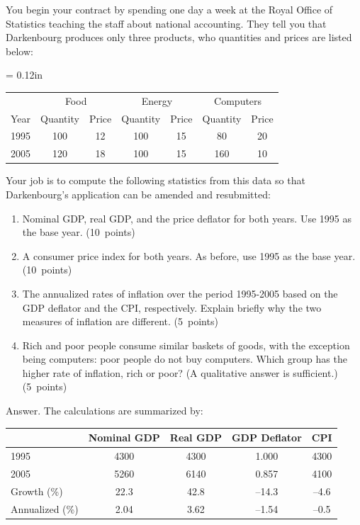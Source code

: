 \documentclass[letterpaper,12pt]{article}
\begin{document}
\begin{enumerate}
You begin your contract by spending one day a week at the Royal
Office of Statistics teaching the staff about national accounting.
They tell you that Darkenbourg produces only three products, 
who quantities and prices are listed below:  
\begin{center}
\tabcolsep = 0.12in
\begin{tabular}{lcccccc}
\hline\hline%
     &\multicolumn{2}{c}{Food}
     &\multicolumn{2}{c}{Energy} 
     &\multicolumn{2}{c}{Computers}\\%
\cline{2-7}%
Year &   Quantity & Price   & Quantity &    Price   &  Quantity & Price    \\
\hline\hline%
1995 &     100    & 12 & 100 & 15 & 80  & 20  \\%
2005 &     120    & 18 & 100 & 15 & 160 & 10 \\%
\hline\hline%
\end{tabular}
\end{center}
Your job is to compute the following statistics from this data so
that Darkenbourg's application can be amended and resubmitted:
%
\begin{enumerate}
\item Nominal GDP, real GDP, and the price deflator for both
years. 
Use 1995 as the base year.  
(10~points)

\item A consumer price index for both years. 
As before, use 1995 as the base year.  (10~points)

\item The annualized rates of inflation over the period 1995-2005
based on the GDP deflator and the CPI, respectively.
Explain briefly why the two measures of inflation are different.  
(5~points)

\item Rich and poor people consume similar baskets of goods,
with the exception being computers:  poor people do not buy 
computers.
Which group has the higher rate of inflation, rich or poor?  
(A qualitative answer is sufficient.) 
(5~points)

\end{enumerate}


Answer.
The calculations are summarized by:
\begin{center}
\begin{tabular}{lcccc}
\hline\hline
         &  Nominal GDP  & Real GDP   &  GDP Deflator  & CPI \\
 \hline\hline
1995     &   4300    & 4300  &  1.000 &  4300  \\
2005     &   5260    & 6140  &  0.857 &  4100 \\
Growth (\%)  & 22.3  &  42.8  &  --14.3  &  --4.6  \\
Annualized (\%) & 2.04 & 3.62 & --1.54 & --0.5 \\
\hline\hline
\end{tabular}
\end{center}


\end{enumerate}
\end{document}
